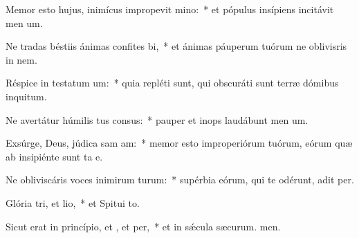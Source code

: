 \item Memor esto hujus, inimícus impropevit mino:~* et pópulus insípiens incitávit men um.
\item Ne tradas béstiis ánimas confites bi,~* et ánimas páuperum tuórum ne oblivisris in nem.
\item Réspice in testatum um:~* quia repléti sunt, qui obscuráti sunt terræ dómibus inquitum.
\item Ne avertátur húmilis tus consus:~* pauper et inops laudábunt men um.
\item Exsúrge, Deus, júdica sam am:~* memor esto improperiórum tuórum, eórum quæ ab insipiénte sunt ta e.
\item Ne obliviscáris voces inimirum turum:~* supérbia eórum, qui te odérunt, adit per.
\item Glória tri, et lio,~* et Spitui to.
\item Sicut erat in princípio, et , et per,~* et in sǽcula sæcurum. men.
